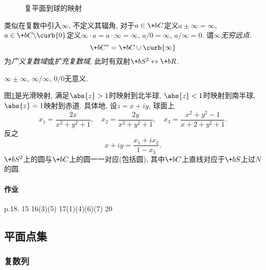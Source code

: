 \documentclass[../ComplexVariable.tex]{subfiles}
\begin{document}

\begin{figure}[ht]
    \centering
    \caption{复平面到球的映射}
    \label{fig:复平面到球的映射}
\end{figure}
类似在复数中引入$\infty$, 不定义其辐角, 对于$a\in \+bC$定义$a\pm\infty = \infty$, $a\in \+bC\backslash \curb{0}$定义$\infty\cdot a = a\cdot \infty = \infty$, $a/0 = \infty$, $a/\infty = 0$. 谓$\infty$\emph{无穷远点}.
\[ \+bC^* = \+bC\cup\curb{\infty} \]
为\emph{广义复数域}或\emph{扩充复数域}, 此时有双射$\+bS^2\leftrightarrow \+bR$.
\begin{pitfall}
    $\infty\pm \infty$, $\infty/\infty$, $0/0$无意义.
\end{pitfall}
图\cref{fig:复平面到球的映射}是光滑映射, 满足$\abs{z}>1$时映射到北半球, $\abs{z}<1$时映射到南半球, $\abs{z}=1$映射到赤道. 具体地, 设$z=x+iy$, 球面上
\[ x_1 = \frac{2x}{x^2+y^2+1},\quad x_2 = \frac{2y}{x^2+y^2+1},\quad x_3 = \frac{x^2+y^2-1}{x+2+y^2+1}. \]
反之
\[ x + iy = \frac{x_1 + ix_2}{1-x_3}. \]
$\+bS^2$上的圆与$\+bC$上的圆一一对应(包括圆), 其中$\+bC$上直线对应于$\+bS$上过$N$的圆.

\paragraph{作业} %
\label{par:作业}

p.18. 15 16(3)(5) 17(1)(4)(6)(7) 20




\subsection{平面点集} %
\label{sub:平面点集}

\subsubsection{复数列} %
\label{ssub:复数列}
\end{document}
